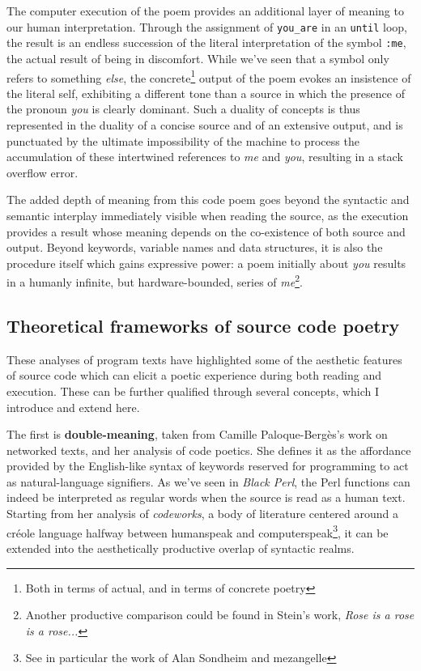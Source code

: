 \documentclass{article}
\begin{document}
The computer execution of the poem provides an additional layer of meaning to our human interpretation. Through the assignment of \lstinline{you_are} in an \lstinline{until} loop, the result is an endless succession of the literal interpretation of the symbol \lstinline{:me}, the actual result of being in discomfort. While we've seen that a symbol only refers to something \emph{else}, the concrete\footnote{Both in terms of actual, and in terms of concrete poetry} output of the poem evokes an insistence of the literal self, exhibiting a different tone than a source in which the presence of the pronoun \emph{you} is clearly dominant. Such a duality of concepts is thus represented in the duality of a concise source and of an extensive output, and is punctuated by the ultimate impossibility of the machine to process the accumulation of these intertwined references to \emph{me} and \emph{you}, resulting in a stack overflow error.

The added depth of meaning from this code poem goes beyond the syntactic and semantic interplay immediately visible when reading the source, as the execution provides a result whose meaning depends on the co-existence of both source and output. Beyond keywords, variable names and data structures, it is also the procedure itself which gains expressive power: a poem initially about \emph{you} results in a humanly infinite, but hardware-bounded, series of \emph{me}\footnote{Another productive comparison could be found in Stein's work, \emph{Rose is a rose is a rose...}}.

\vspace{1\baselineskip}

\subsection{Theoretical frameworks of source code poetry}

These analyses of program texts have highlighted some of the aesthetic features of source code which can elicit a poetic experience during both reading and execution. These can be further qualified through several concepts, which I introduce and extend here.

The first is \textbf{double-meaning}, taken from Camille Paloque-Bergès's work on networked texts, and her analysis of code poetics\cite{paloque-berges_poetique_2009}. She defines it as the affordance provided by the English-like syntax of keywords reserved for programming to act as natural-language signifiers. As we've seen in \emph{Black Perl}, the Perl functions can indeed be interpreted as regular words when the source is read as a human text. Starting from her analysis of \emph{codeworks}, a body of literature centered around a créole language halfway between humanspeak and computerspeak\footnote{See in particular the work of Alan Sondheim and mezangelle}, it can be extended into the aesthetically productive overlap of syntactic realms.
\end{document}
